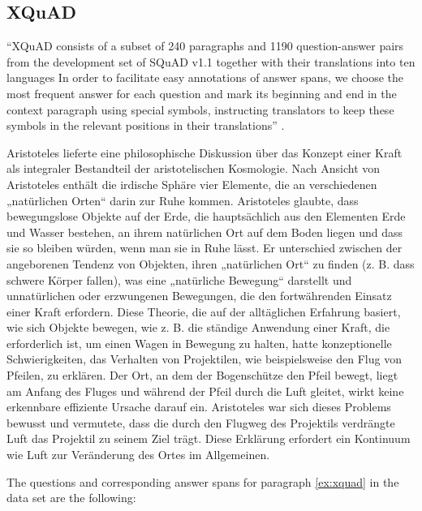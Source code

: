 \subsection{XQuAD}

``XQuAD consists of a subset of 240 paragraphs and 1190 question-answer pairs from the development
set of SQuAD v1.1 together with their translations into ten languages \textelp{} In order to
facilitate easy annotations of answer spans, we choose the most frequent answer for each question
and mark its beginning and end in the context paragraph using special symbols, instructing
translators to keep these symbols in the relevant positions in their translations''
\cite{artetxe2019cross}.

\begin{examples}
  \label{ex:xquad}
  \item Aristoteles lieferte eine philosophische Diskussion über das Konzept einer Kraft
als integraler Bestandteil der aristotelischen Kosmologie. Nach Ansicht von Aristoteles enthält
die irdische Sphäre vier Elemente, die an verschiedenen „natürlichen Orten“ darin zur Ruhe
kommen. Aristoteles glaubte, dass bewegungslose Objekte auf der Erde, die hauptsächlich aus den
Elementen Erde und Wasser bestehen, an ihrem natürlichen Ort auf dem Boden liegen und dass sie so
bleiben würden, wenn man sie in Ruhe lässt. Er unterschied zwischen der angeborenen Tendenz von
Objekten, ihren „natürlichen Ort“ zu finden (z. B. dass schwere Körper fallen), was eine
„natürliche Bewegung“ darstellt und unnatürlichen oder erzwungenen Bewegungen, die den
fortwährenden Einsatz einer Kraft erfordern. Diese Theorie, die auf der alltäglichen Erfahrung
basiert, wie sich Objekte bewegen, wie z. B. die ständige Anwendung einer Kraft, die erforderlich
ist, um einen Wagen in Bewegung zu halten, hatte konzeptionelle Schwierigkeiten, das Verhalten von
Projektilen, wie beispielsweise den Flug von Pfeilen, zu erklären. Der Ort, an dem der
Bogenschütze den Pfeil bewegt, liegt am Anfang des Fluges und während der Pfeil durch die Luft
gleitet, wirkt keine erkennbare effiziente Ursache darauf ein. Aristoteles war sich dieses
Problems bewusst und vermutete, dass die durch den Flugweg des Projektils verdrängte Luft das
Projektil zu seinem Ziel trägt. Diese Erklärung erfordert ein Kontinuum wie Luft zur
Veränderung des Ortes im Allgemeinen.
\end{examples}

The questions and corresponding answer spans for paragraph \ref{ex:xquad} in the data set are the
following:

